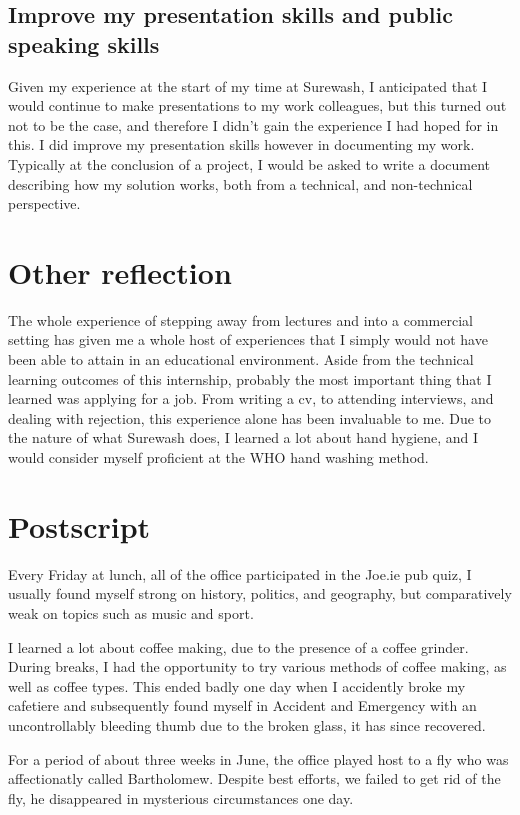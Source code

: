     \subsection{Improve my presentation skills and public speaking skills} Given my experience at the start of my time at Surewash, I anticipated that I would continue to make presentations to my work colleagues, but this turned out not to be the case, and therefore I didn't gain the experience I had hoped for in this. I did improve my presentation skills however in documenting my work. Typically at the conclusion of a project, I would be asked to write a document describing how my solution works, both from a technical, and non-technical perspective.

\section{Other reflection}
The whole experience of stepping away from lectures and into a commercial setting has given me a whole host of experiences that I simply would not have been able to attain in an educational environment. Aside from the technical learning outcomes of this internship, probably the most important thing that I learned was applying for a job. From writing a cv, to attending interviews, and dealing with rejection, this experience alone has been invaluable to me. Due to the nature of what Surewash does, I learned a lot about hand hygiene, and I would consider myself proficient at the WHO hand washing method.

\section{Postscript}
Every Friday at lunch, all of the office participated in the Joe.ie pub quiz, I usually found myself strong on history, politics, and geography, but comparatively weak on topics such as music and sport.

I learned a lot about coffee making, due to the presence of a coffee grinder. During breaks, I had the opportunity to try various methods of coffee making, as well as coffee types. This ended badly one day when I accidently broke my cafetiere and subsequently found myself in Accident and Emergency with an uncontrollably bleeding thumb due to the broken glass, it has since recovered.

For a period of about three weeks in June, the office played host to a fly who was affectionatly called Bartholomew. Despite best efforts, we failed to get rid of the fly, he disappeared in mysterious circumstances one day.